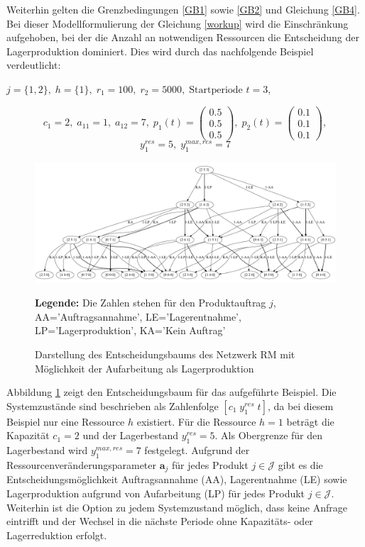 Weiterhin gelten die Grenzbedingungen \eqref{GB1} sowie \eqref{GB2} und Gleichung \eqref{GB4}. Bei dieser Modellformulierung der Gleichung \eqref{workup} wird die Einschränkung aufgehoben, bei der die Anzahl an notwendigen Ressourcen die Entscheidung der Lagerproduktion dominiert. Dies wird durch das nachfolgende Beispiel verdeutlicht:
\begin{center}
$j = \{1, 2\}, \; h = \{1\}, \; r_{1} = 100, \; r_{2} = 5000, \; \text{Startperiode } t=3$,
\end{center}
\[
    c_{1}=2, \;
    a_{11}=1, \;
     a_{12}=7, \;
     p_{1}(t)=\begin{pmatrix} 0.5\\ 0.5\\ 0.5  \end{pmatrix}, \;
     p_{2}(t)=\begin{pmatrix} 0.1\\ 0.1\\ 0.1  \end{pmatrix},
  \]
  \[
    y_{1}^{res}= 5, \;
    y_{1}^{max,res}=7
      \]
\begin{figure}[h!]
  \begin{center}
    \includegraphics[width=130mm]{Bilder/Beispiel5.pdf}
    \caption{Darstellung des Entscheidungsbaums des Netzwerk RM mit Möglichkeit der Aufarbeitung als Lagerproduktion}  \label{B5}
    {\footnotesize \textbf{Legende:} Die Zahlen stehen für den Produktauftrag $j$, AA='Auftragsannahme', LE='Lagerentnahme', LP='Lagerproduktion', KA='Kein Auftrag'} 
  \end{center}
\end{figure}

Abbildung \ref{B5} zeigt den Entscheidungsbaum für das aufgeführte Beispiel. Die Systemzustände sind beschrieben als Zahlenfolge $[c_{1}\; y_{1}^{res}\;t]$, da bei diesem Beispiel nur eine Ressource $h$ existiert. Für die Ressource $h=1$ beträgt die Kapazität $c_{1}=2$ und der Lagerbestand $y_{1}^{res}=5$. Als Obergrenze für den Lagerbestand wird $y_{1}^{max,res}=7$ festgelegt. Aufgrund der Ressourcenveränderungsparameter $\textbf{a}_{j}$ für jedes Produkt $j\in\mathcal{J}$ gibt es die Entscheidungsmöglichkeit Auftragsannahme (AA), Lagerentnahme (LE) sowie Lagerproduktion aufgrund von Aufarbeitung (LP) für jedes Produkt $j\in\mathcal{J}$. Weiterhin ist die Option zu jedem Systemzustand möglich, dass keine Anfrage eintrifft und der Wechsel in die nächste Periode ohne Kapazitäts- oder Lagerreduktion erfolgt.

